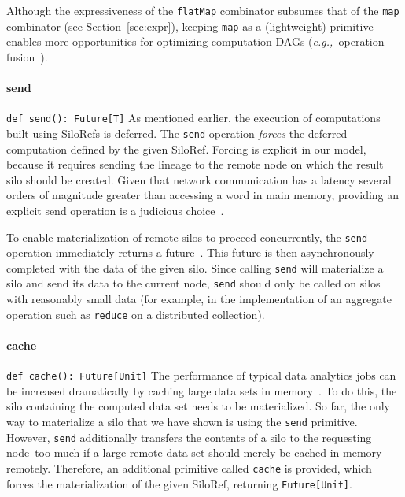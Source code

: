 \documentclass[10pt]{sigplanconf}
\theoremstyle{definition}
\theoremstyle{definition}
\newcommand{\eg}{{\em e.g.,~}}
\begin{document}
Although the expressiveness of the \verb|flatMap| combinator subsumes that of
the \verb|map| combinator (see Section~\ref{sec:expr}), keeping \verb|map| as a
(lightweight) primitive enables more opportunities for optimizing computation
DAGs (\eg operation fusion~\cite{FlumeJava}).

\paragraph{send}%
%
\texttt{def send(): Future[T]} \newline
%
As mentioned earlier, the execution of computations built using SiloRefs is
deferred. The \verb|send| operation {\em forces} the deferred computation defined
by the given SiloRef.  Forcing is explicit in our model, because it requires
sending the lineage to the remote node on which the result silo should be
created. Given that network communication has a latency several orders of
magnitude greater than accessing a word in main memory, providing an explicit
send operation is a judicious choice~\cite{ANoteDistComp}.

To enable materialization of remote silos to proceed concurrently, the
\verb|send| operation immediately returns a future~\cite{Futures}. This future
is then asynchronously completed with the data of the given silo. Since calling
\verb|send| will materialize a silo and send its data to the current node,
\verb|send| should only be called on silos with reasonably small data (for
example, in the implementation of an aggregate operation such as \verb|reduce|
on a distributed collection).

\paragraph{cache}%
%
\texttt{def cache(): Future[Unit]} \newline
%
The performance of typical data analytics jobs can be increased dramatically by
caching large data sets in memory~\cite{Spark}. To do this, the silo containing
the computed data set needs to be materialized. So far, the only way to
materialize a silo that we have shown is using the \verb|send| primitive.
However, \verb|send| additionally transfers the contents of a silo to the
requesting node--too much if a large remote data set should merely be cached in
memory remotely.  Therefore, an additional primitive called \verb|cache| is
provided, which forces the materialization of the given SiloRef, returning
\verb|Future[Unit]|.
\end{document}
